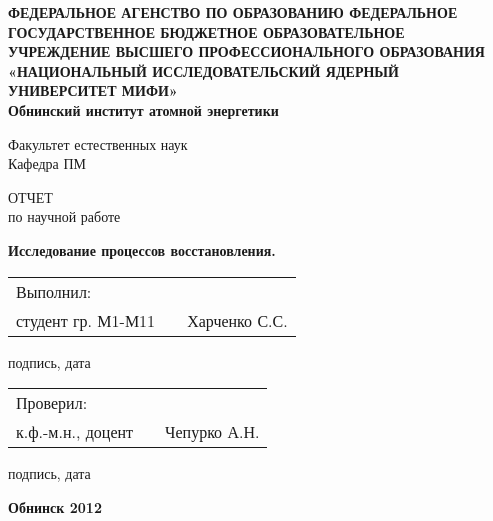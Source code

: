 \begin{titlepage}

\begin{center} \bfseries
ФЕДЕРАЛЬНОЕ АГЕНСТВО ПО ОБРАЗОВАНИЮ
ФЕДЕРАЛЬНОЕ ГОСУДАРСТВЕННОЕ БЮДЖЕТНОЕ ОБРАЗОВАТЕЛЬНОЕ 
УЧРЕЖДЕНИЕ  ВЫСШЕГО ПРОФЕССИОНАЛЬНОГО ОБРАЗОВАНИЯ 
«НАЦИОНАЛЬНЫЙ ИССЛЕДОВАТЕЛЬСКИЙ ЯДЕРНЫЙ УНИВЕРСИТЕТ МИФИ»\\
Обнинский институт атомной энергетики
\\ \vspace{1cm}

Факультет естественных наук\\
Кафедра ПМ
\end{center}
\medskip

\vspace{3cm}

\begin{center}
{\large ОТЧЕТ \\ по научной работе}\\ \vspace{1cm}

{\bfseries Исследование процессов восстановления.}\\
\vspace{2cm}

\end{center}
\vspace{2cm}

\begin{tabular*}{14cm}{p{5cm}p{6cm}r}
Выполнил:\\
студент гр. М1-М11& \underline{\hspace{5cm}} & Харченко С.С.
\end{tabular*}
\begin{center}
подпись, дата
\end{center}

\vspace{1cm}

\begin{tabular*}{14cm}{p{5cm}p{6cm}r}
Проверил:\\
к.ф.-м.н., доцент & \underline{\hspace{5cm}} & Чепурко А.Н.
\end{tabular*}
\begin{center}
подпись, дата
\end{center}

\vspace{4cm}

\begin{center}
 \bfseries Обнинск 2012
\end{center}

\end{titlepage}